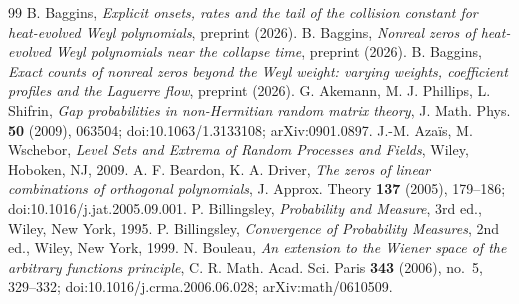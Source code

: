 \documentclass[11pt]{amsart}
\theoremstyle{definition}
\theoremstyle{remark}
\numberwithin{equation}{section}
\begin{document}
\begin{thebibliography}{99}
 B. Baggins, \emph{Explicit onsets, rates and the tail of the collision constant for heat-evolved Weyl polynomials}, preprint (2026).
 B. Baggins, \emph{Nonreal zeros of heat-evolved Weyl polynomials near the collapse time}, preprint (2026).
 B. Baggins, \emph{Exact counts of nonreal zeros beyond the Weyl weight: varying weights, coefficient profiles and the Laguerre flow}, preprint (2026).
 G. Akemann, M. J. Phillips, L. Shifrin, \emph{Gap probabilities in non-Hermitian random matrix theory}, J. Math. Phys. \textbf{50} (2009), 063504; doi:10.1063/1.3133108; arXiv:0901.0897.
 J.-M. Aza\"is, M. Wschebor, \emph{Level Sets and Extrema of Random Processes and Fields}, Wiley, Hoboken, NJ, 2009.
 A. F. Beardon, K. A. Driver, \emph{The zeros of linear combinations of orthogonal polynomials}, J. Approx. Theory \textbf{137} (2005), 179--186; doi:10.1016/j.jat.2005.09.001.
 P. Billingsley, \emph{Probability and Measure}, 3rd ed., Wiley, New York, 1995.
 P. Billingsley, \emph{Convergence of Probability Measures}, 2nd ed., Wiley, New York, 1999.
 N. Bouleau, \emph{An extension to the Wiener space of the arbitrary functions principle}, C. R. Math. Acad. Sci. Paris \textbf{343} (2006), no.~5, 329--332; doi:10.1016/j.crma.2006.06.028; arXiv:math/0610509.

\end{thebibliography}
\end{document}
